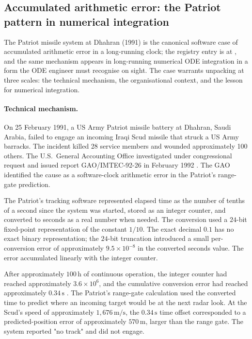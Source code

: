 \subsection{Accumulated arithmetic error: the Patriot pattern in numerical integration}

The Patriot missile system at Dhahran (1991) is the canonical
software case of accumulated arithmetic error in a long-running
clock; the registry entry is at
, and the
same mechanism appears in long-running numerical ODE integration in
a form the ODE engineer must recognise on sight. The case warrants
unpacking at three scales: the technical mechanism, the
organisational context, and the lesson for numerical integration.

\paragraph{Technical mechanism.} On 25 February 1991, a US Army
Patriot missile battery at Dhahran, Saudi Arabia, failed to engage
an incoming Iraqi Scud missile that struck a US Army barracks. The
incident killed 28 service members and wounded approximately 100
others. The U.S.\ General Accounting Office investigated under
congressional request and issued report GAO/IMTEC-92-26 in
February 1992 \cite{acc:gao-patriot-1992}. The GAO identified the
cause as a software-clock arithmetic error in the Patriot's
range-gate prediction.

The Patriot's tracking software represented elapsed time as the
number of tenths of a second since the system was started, stored
as an integer counter, and converted to seconds as a real number
when needed. The conversion used a $24$-bit fixed-point
representation of the constant $1/10$. The exact decimal $0.1$ has
no exact binary representation; the $24$-bit truncation introduced
a small per-conversion error of approximately $9.5 \times 10^{-8}$
in the converted seconds value. The error accumulated linearly with
the integer counter.

After approximately $100\,\si{\hour}$ of continuous operation, the
integer counter had reached approximately $3.6 \times 10^{6}$, and
the cumulative conversion error had reached approximately
$0.34\,\si{\second}$ \cite{acc:gao-patriot-1992}. The Patriot's
range-gate calculation used the converted time to predict where an
incoming target would be at the next radar look. At the Scud's
speed of approximately $1{,}676\,\si{\meter\per\second}$, the
$0.34\,\si{\second}$ time offset corresponded to a predicted-position
error of approximately $570\,\si{\meter}$, larger than the range
gate. The system reported "no track" and did not engage.

